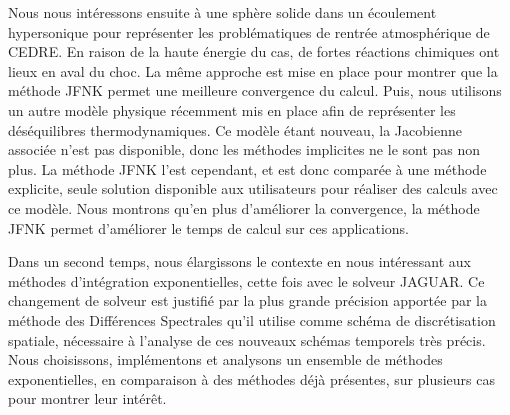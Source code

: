 Nous nous intéressons ensuite à une sphère solide dans un écoulement hypersonique pour représenter les problématiques de rentrée atmosphérique de CEDRE.
En raison de la haute énergie du cas, de fortes réactions chimiques ont lieux en aval du choc.
La même approche est mise en place pour montrer que la méthode JFNK permet une meilleure convergence du calcul.
Puis, nous utilisons un autre modèle physique récemment mis en place afin de représenter les déséquilibres thermodynamiques.
Ce modèle étant nouveau, la Jacobienne associée n'est pas disponible, donc les méthodes implicites ne le sont pas non plus.
La méthode JFNK l'est cependant, et est donc comparée à une méthode explicite, seule solution disponible aux utilisateurs pour réaliser des calculs avec ce modèle.
Nous montrons qu'en plus d'améliorer la convergence, la méthode JFNK permet d'améliorer le temps de calcul sur ces applications.

Dans un second temps, nous élargissons le contexte en nous intéressant aux méthodes d'intégration exponentielles, cette fois avec le solveur JAGUAR.
Ce changement de solveur est justifié par la plus grande précision apportée par la méthode des Différences Spectrales qu'il utilise comme schéma de discrétisation spatiale, nécessaire à l'analyse de ces nouveaux schémas temporels très précis.
Nous choisissons, implémentons et analysons un ensemble de méthodes exponentielles, en comparaison à des méthodes déjà présentes, sur plusieurs cas pour montrer leur intérêt.
